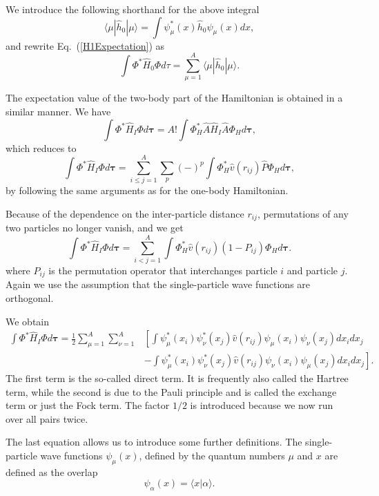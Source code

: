 \documentclass[graybox,sectrefs,envcountresetchap,open=right]{svmonodo}
\begin{document}
We introduce the following shorthand for the above integral
\[
\langle \mu | \hat{h}_0 | \mu \rangle = \int \psi_{\mu}^*(x)\hat{h}_0\psi_{\mu}(x)dx,
\]
and rewrite Eq.~(\ref{H1Expectation}) as
\begin{equation}
  \int \Phi^*\hat{H}_0\Phi  d\tau
  = \sum_{\mu=1}^A \langle \mu | \hat{h}_0 | \mu \rangle.
  \label{H1Expectation1}
\end{equation}



The expectation value of the two-body part of the Hamiltonian is obtained in a
similar manner. We have
\[
  \int \Phi^*\hat{H}_I\Phi d\mathbf{\tau} 
  = A! \int \Phi_H^*\hat{A}\hat{H}_I\hat{A}\Phi_H d\mathbf{\tau},
\]
which reduces to
\[
 \int \Phi^*\hat{H}_I\Phi d\mathbf{\tau} 
  = \sum_{i\le j=1}^A \sum_{p} (-)^p\int 
  \Phi_H^*\hat{v}(r_{ij})\hat{P}\Phi_H d\mathbf{\tau},
\]
by following the same arguments as for the one-body
Hamiltonian. 



Because of the dependence on the inter-particle distance $r_{ij}$,  permutations of
any two particles no longer vanish, and we get
\[
  \int \Phi^*\hat{H}_I\Phi d\mathbf{\tau} 
  = \sum_{i < j=1}^A \int  
  \Phi_H^*\hat{v}(r_{ij})(1-P_{ij})\Phi_H d\mathbf{\tau}.
\]
where $P_{ij}$ is the permutation operator that interchanges
particle $i$ and particle $j$. Again we use the assumption that the single-particle wave functions
are orthogonal. 





We obtain
\begin{equation}
\begin{split}
  \int \Phi^*\hat{H}_I\Phi d\mathbf{\tau} 
  = \frac{1}{2}\sum_{\mu=1}^A\sum_{\nu=1}^A
    &\left[ \int \psi_{\mu}^*(x_i)\psi_{\nu}^*(x_j)\hat{v}(r_{ij})\psi_{\mu}(x_i)\psi_{\nu}(x_j)
    dx_idx_j \right.\\
  &\left.
  - \int \psi_{\mu}^*(x_i)\psi_{\nu}^*(x_j)
  \hat{v}(r_{ij})\psi_{\nu}(x_i)\psi_{\mu}(x_j)
  dx_idx_j
  \right]. \label{H2Expectation}
\end{split}
\end{equation}
The first term is the so-called direct term. It is frequently also called the  Hartree term, 
while the second is due to the Pauli principle and is called
the exchange term or just the Fock term.
The factor  $1/2$ is introduced because we now run over
all pairs twice. 



The last equation allows us to  introduce some further definitions.  
The single-particle wave functions $\psi_{\mu}(x)$, defined by the quantum numbers $\mu$ and $x$
are defined as the overlap 
\[
   \psi_{\alpha}(x)  = \langle x | \alpha \rangle .
\]
\end{document}
